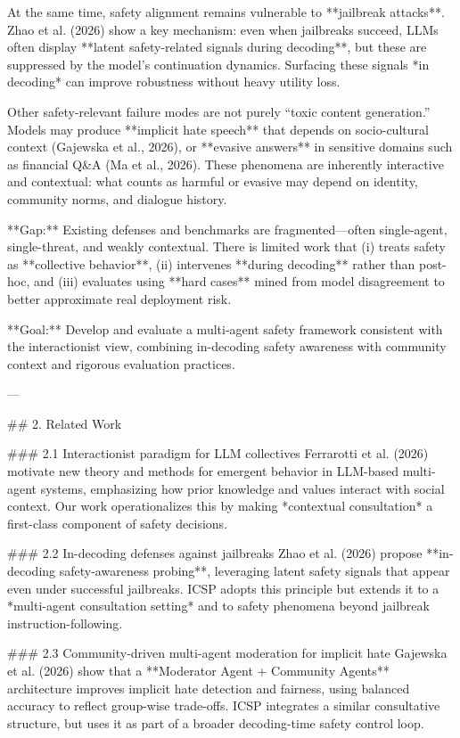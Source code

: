 At the same time, safety alignment remains vulnerable to **jailbreak attacks**. Zhao et al. (2026) show a key mechanism: even when jailbreaks succeed, LLMs often display **latent safety-related signals during decoding**, but these are suppressed by the model’s continuation dynamics. Surfacing these signals *in decoding* can improve robustness without heavy utility loss.

Other safety-relevant failure modes are not purely “toxic content generation.” Models may produce **implicit hate speech** that depends on socio-cultural context (Gajewska et al., 2026), or **evasive answers** in sensitive domains such as financial Q&A (Ma et al., 2026). These phenomena are inherently interactive and contextual: what counts as harmful or evasive may depend on identity, community norms, and dialogue history.

**Gap:** Existing defenses and benchmarks are fragmented—often single-agent, single-threat, and weakly contextual. There is limited work that (i) treats safety as **collective behavior**, (ii) intervenes **during decoding** rather than post-hoc, and (iii) evaluates using **hard cases** mined from model disagreement to better approximate real deployment risk.

**Goal:** Develop and evaluate a multi-agent safety framework consistent with the interactionist view, combining in-decoding safety awareness with community context and rigorous evaluation practices.

---

## 2. Related Work  

### 2.1 Interactionist paradigm for LLM collectives  
Ferrarotti et al. (2026) motivate new theory and methods for emergent behavior in LLM-based multi-agent systems, emphasizing how prior knowledge and values interact with social context. Our work operationalizes this by making *contextual consultation* a first-class component of safety decisions.

### 2.2 In-decoding defenses against jailbreaks  
Zhao et al. (2026) propose **in-decoding safety-awareness probing**, leveraging latent safety signals that appear even under successful jailbreaks. ICSP adopts this principle but extends it to a *multi-agent consultation setting* and to safety phenomena beyond jailbreak instruction-following.

### 2.3 Community-driven multi-agent moderation for implicit hate  
Gajewska et al. (2026) show that a **Moderator Agent + Community Agents** architecture improves implicit hate detection and fairness, using balanced accuracy to reflect group-wise trade-offs. ICSP integrates a similar consultative structure, but uses it as part of a broader decoding-time safety control loop.

